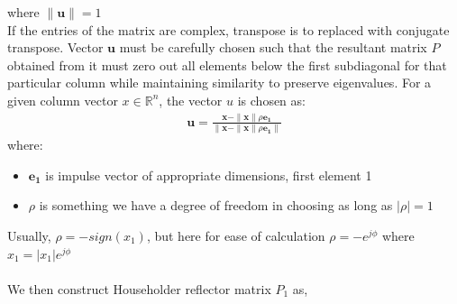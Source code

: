 \documentclass[journal]{IEEEtran}
\begin{document}
where $\|\textbf{u}\|=1$\\
If the entries of the matrix are complex, transpose is to replaced with conjugate transpose.
Vector $\textbf{u}$ must be carefully chosen such that the resultant matrix $P$ obtained from it must zero out all elements below the first subdiagonal for that particular column while maintaining similarity to preserve eigenvalues.
For a given column vector $x \in \mathbb{R}^n$, the vector $u$ is chosen as:
\begin{align}
\mathbf{u} = \frac{\mathbf{x} - \|\mathbf{x}\| \rho \mathbf{e_1}}{\|\mathbf{x} - \|\mathbf{x}\| \rho \mathbf{e_1}\|}
\end{align}
where:
\begin{itemize}
    \item $\mathbf{e_1}$ is impulse vector of appropriate dimensions, first element 1
    \item $\rho$ is something we have a degree of freedom in choosing as long as $|\rho|=1$
\end{itemize}
Usually, $\rho=-sign(x_1)$, but here for ease of calculation $\rho= -e^{j\phi}$ where $x_1=|x_1| e^{j\phi}$\\\\
We then construct Householder reflector matrix $P_1$ as,
\end{document}
